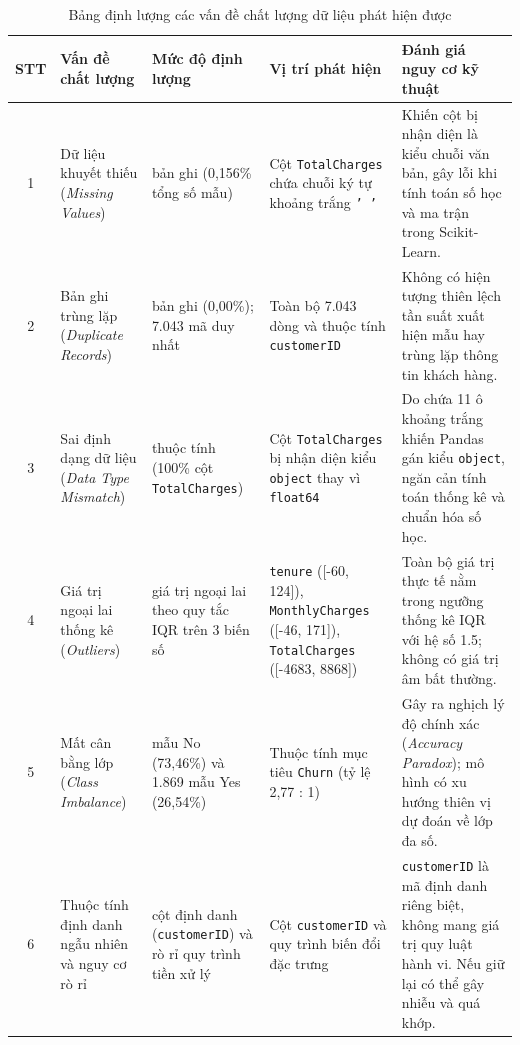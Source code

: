 \documentclass[a4paper]{article}
\renewcommand{\arraystretch}{1.25} %
\begin{document}
{\begin{table}[htbp]
\centering
\caption{Bảng định lượng các vấn đề chất lượng dữ liệu phát hiện được}
\label{tab:chat_luong_dl}
\small
\setlength{\tabcolsep}{4.2pt}
\renewcommand{\arraystretch}{1.12}
\begin{tabularx}{\textwidth}{| c | >{\raggedright\arraybackslash}p{2.6cm} | >{\raggedright\arraybackslash}p{2.7cm} | >{\raggedright\arraybackslash}p{3.2cm} | >{\raggedright\arraybackslash}X |}
\hline
\textbf{STT} & \textbf{Vấn đề chất lượng} & \textbf{Mức độ định lượng} & \textbf{Vị trí phát hiện} & \textbf{Đánh giá nguy cơ kỹ thuật} \\
\hline
1 & Dữ liệu khuyết thiếu (\textit{Missing Values}) & 11 bản ghi (0,156\% tổng số mẫu) & Cột \texttt{TotalCharges} chứa chuỗi ký tự khoảng trắng \texttt{' '} & Khiến cột bị nhận diện là kiểu chuỗi văn bản, gây lỗi khi tính toán số học và ma trận trong Scikit-Learn. \\
\hline
2 & Bản ghi trùng lặp (\textit{Duplicate Records}) & 0 bản ghi (0,00\%); 7.043 mã duy nhất & Toàn bộ 7.043 dòng và thuộc tính \texttt{customerID} & Không có hiện tượng thiên lệch tần suất xuất hiện mẫu hay trùng lặp thông tin khách hàng. \\
\hline
3 & Sai định dạng dữ liệu (\textit{Data Type Mismatch}) & 1 thuộc tính (100\% cột \texttt{TotalCharges}) & Cột \texttt{TotalCharges} bị nhận diện kiểu \texttt{object} thay vì \texttt{float64} & Do chứa 11 ô khoảng trắng khiến Pandas gán kiểu \texttt{object}, ngăn cản tính toán thống kê và chuẩn hóa số học. \\
\hline
4 & Giá trị ngoại lai thống kê (\textit{Outliers}) & 0 giá trị ngoại lai theo quy tắc IQR trên 3 biến số & \texttt{tenure} ([-60, 124]), \texttt{MonthlyCharges} ([-46, 171]), \texttt{TotalCharges} ([-4683, 8868]) & Toàn bộ giá trị thực tế nằm trong ngưỡng thống kê IQR với hệ số 1.5; không có giá trị âm bất thường. \\
\hline
5 & Mất cân bằng lớp (\textit{Class Imbalance}) & 5.174 mẫu No (73,46\%) và 1.869 mẫu Yes (26,54\%) & Thuộc tính mục tiêu \texttt{Churn} (tỷ lệ 2,77 : 1) & Gây ra nghịch lý độ chính xác (\textit{Accuracy Paradox}); mô hình có xu hướng thiên vị dự đoán về lớp đa số. \\
\hline
6 & Thuộc tính định danh ngẫu nhiên và nguy cơ rò rỉ & 1 cột định danh (\texttt{customerID}) và rò rỉ quy trình tiền xử lý & Cột \texttt{customerID} và quy trình biến đổi đặc trưng & \texttt{customerID} là mã định danh riêng biệt, không mang giá trị quy luật hành vi. Nếu giữ lại có thể gây nhiễu và quá khớp. \\
\hline
\end{tabularx}
\end{table}

}
\end{document}
